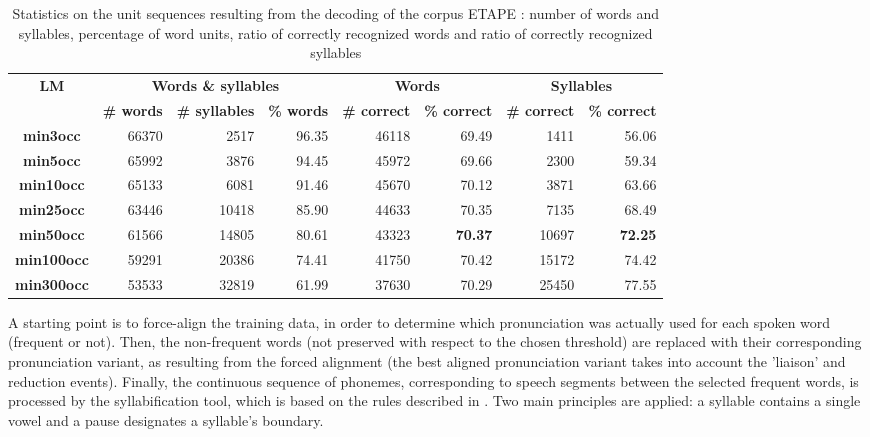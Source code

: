\documentclass[a4paper]{article}
\begin{document}
\begin{table}[b]
\centering
\begin{tabular}{|c||r|r|r||r|r||r|r|}
\hline
\multirow{2}{*}{\bf LM}  & \multicolumn{3}{c||}{\bf Words \& syllables} & \multicolumn{2}{c||}{\bf Words} & \multicolumn{2}{c|}{\bf Syllables}  	\\ \cline{2-8}
 & {\bf \# words} & {\bf \# syllables} &  {\bf \% words } & {\bf \# correct} & {\bf \% correct} & {\bf \# correct} & {\bf \% correct} 	\\ \hline\hline
{\bf min3occ}     & 66370 &   2517  & 96.35 & 46118 & 69.49 &   1411 & 56.06 		\\ \hline
{\bf min5occ}     & 65992 &   3876  & 94.45 & 45972 & 69.66 &   2300 & 59.34 		\\ \hline
{\bf min10occ}    & 65133 &   6081  & 91.46 & 45670 & 70.12 &   3871 & 63.66 		\\ \hline
{\bf min25occ}    & 63446 &  10418  & 85.90 & 44633 & 70.35 &   7135 & 68.49 		\\ \hline
{\bf min50occ}    & 61566 &  14805  & 80.61 & 43323 & {\bf 70.37} &  10697 & {\bf 72.25} 		\\ \hline
{\bf min100occ}   & 59291 &  20386  & 74.41 & 41750 & 70.42 &  15172 & 74.42 		\\ \hline
{\bf min300occ}   & 53533 &  32819  & 61.99 & 37630 & 70.29 &  25450 & 77.55  		\\ \hline
\end{tabular}
\caption{Statistics on the unit sequences resulting from the decoding of the corpus ETAPE : number of words and syllables, percentage of word units, ratio of correctly recognized words and ratio of correctly recognized syllables}
\label{Tab:RecWords}
\end{table}

A starting point is to force-align the training data, in order to determine which pronunciation was actually used for each spoken word (frequent or not).
Then, the non-frequent words (not preserved with respect to the chosen threshold) are replaced with their corresponding pronunciation variant, as resulting from the forced alignment (the best aligned pronunciation variant takes into account the 'liaison' and reduction events).
Finally, the continuous sequence of phonemes, corresponding to speech segments between the selected frequent words, is processed by the syllabification tool, which is based on the rules described in \cite{bigi2010}.
Two main principles are applied: a syllable contains a single vowel and a pause designates a syllable’s boundary.
\end{document}

